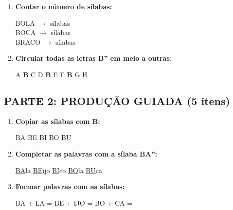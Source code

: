 \begin{exercicio}
\begin{enumerate}
  \item \textbf{Contar o número de sílabas:}
  \begin{center}
  BOLA $\rightarrow$ \underline{\hspace{1cm}} sílabas \\
  BOCA $\rightarrow$ \underline{\hspace{1cm}} sílabas \\
  BRACO $\rightarrow$ \underline{\hspace{1cm}} sílabas
  \end{center}

  \item \textbf{Circular todas as letras B'' em meio a outras:}
  \begin{center}
  A \quad \textbf{B} \quad C \quad D \quad \textbf{B} \quad E \quad F \quad \textbf{B} \quad G \quad H
  \end{center}
\end{enumerate}

\subsection*{PARTE 2: PRODUÇÃO GUIADA (5 itens)}

\begin{enumerate}[resume]
  \item \textbf{Copiar as sílabas com B:}
  \begin{center}
  BA \quad \underline{\hspace{1.5cm}} \quad BE \quad \underline{\hspace{1.5cm}} \quad BI \quad \underline{\hspace{1.5cm}} \quad BO \quad \underline{\hspace{1.5cm}} \quad BU \quad \underline{\hspace{1.5cm}}
  \end{center}

  \item \textbf{Completar as palavras com a sílaba BA'':}
  \begin{center}
  \underline{BA}la \quad \underline{BE}ijo \quad \underline{BI}co \quad \underline{BO}la \quad \underline{BU}ca
  \end{center}

  \item \textbf{Formar palavras com as sílabas:}
  \begin{center}
  BA + LA = \underline{\hspace{2cm}} \quad BE + IJO = \underline{\hspace{2cm}} \quad BO + CA = \underline{\hspace{2cm}}
  \end{center}


\end{enumerate}
\end{exercicio}

